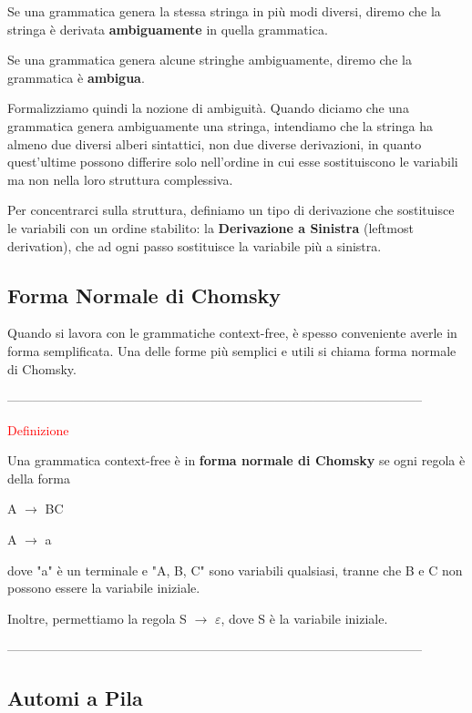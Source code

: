 \documentclass{article}
\begin{document}
Se una grammatica genera la stessa stringa in più modi diversi, diremo che la stringa è derivata \textbf{ambiguamente} in quella grammatica. 

Se una grammatica genera alcune stringhe ambiguamente, diremo che la grammatica è \textbf{ambigua}.

Formalizziamo quindi la nozione di ambiguità. Quando diciamo che una grammatica genera ambiguamente una stringa, intendiamo che la stringa ha almeno due diversi alberi sintattici, non due diverse derivazioni, in quanto quest'ultime possono differire solo nell'ordine in cui esse sostituiscono le variabili ma non nella loro struttura complessiva.

Per concentrarci sulla struttura, definiamo un tipo di derivazione che sostituisce le variabili con un ordine stabilito: la \textbf{Derivazione a Sinistra} (leftmost derivation), che ad ogni passo sostituisce la variabile più a sinistra.

\subsection{Forma Normale di Chomsky}

Quando si lavora con le grammatiche context-free, è spesso conveniente averle in forma semplificata. Una delle forme più semplici e utili si chiama forma normale di Chomsky.

--------------------------------------------------------------------------------------------------

\begin{center}
    \textcolor{red}{Definizione}
\end{center}

Una grammatica context-free è in \textbf{forma normale di Chomsky} se ogni regola è della forma

\begin{center}
    A $\rightarrow$ BC

    A $\rightarrow$ a
\end{center}

dove "a" è un terminale e "A, B, C" sono variabili qualsiasi, tranne che B e C non possono essere la variabile iniziale.

Inoltre, permettiamo la regola S $\rightarrow$ $\varepsilon$, dove S è la variabile iniziale.

--------------------------------------------------------------------------------------------------

\subsection{Automi a Pila}
\end{document}
